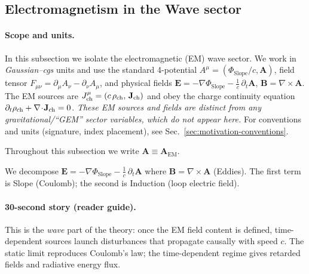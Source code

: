 \subsection{Electromagnetism in the Wave sector}
\label{subsec:em_wave}

\paragraph{Scope and units.}
In this subsection we isolate the electromagnetic (EM) wave sector. We work in \emph{Gaussian--cgs} units and use the standard 4-potential
\(A^\mu=(\Phi_{\text{Slope}}/c,\mathbf A)\), field tensor \(F_{\mu\nu}=\partial_\mu A_\nu-\partial_\nu A_\mu\),
and physical fields \(\mathbf E=-\nabla\Phi_{\text{Slope}}-\tfrac1c\,\partial_t\mathbf A\), \(\mathbf B=\nabla\times\mathbf A\).
The EM sources are \(J^\mu_{\rm ch}=(c\,\rho_{\rm ch},\,\mathbf J_{\rm ch})\) and obey the
charge continuity equation \(\partial_t\rho_{\rm ch}+\nabla\!\cdot\!\mathbf J_{\rm ch}=0\).
\emph{These EM sources and fields are distinct from any gravitational/``GEM'' sector variables, which do not appear here.}
For conventions and units (signature, index placement), see Sec.~\ref{sec:motivation-conventions}.

Throughout this subsection we write $\mathbf A \equiv \mathbf A_{\text{EM}}$.

We decompose $\mathbf E = -\nabla \Phi_{\text{Slope}} - \tfrac{1}{c}\,\partial_t \mathbf A$ where $\mathbf B=\nabla\times\mathbf A$ (Eddies). The first term is Slope (Coulomb); the second is Induction (loop electric field).

\paragraph{30-second story (reader guide).}
This is the \emph{wave} part of the theory: once the EM field content is defined,
time-dependent sources launch disturbances that propagate causally with speed \(c\).
The static limit reproduces Coulomb's law; the time-dependent regime gives retarded fields and radiative energy flux.

